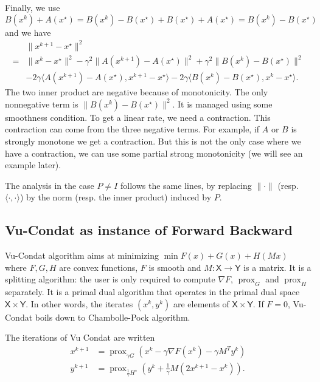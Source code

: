 \documentclass{article}
\DeclareMathOperator{\prox}{prox}
\newcommand{\sX}{{\mathsf X}}
\newcommand{\sY}{{\mathsf Y}}
\newcommand{\ps}[1]{\langle #1 \rangle}
\theoremstyle{definition}
\begin{document}
Finally, we use
$$B(x^k) + A(x^\star) = B(x^k) - B(x^\star) + B(x^\star) + A(x^\star) = B(x^k) - B(x^\star)$$
and we have 
\begin{align}
    \label{eq:FB-final}
    &\|x^{k+1} - x^\star\|^2 \\
    =& \|x^k - x^\star\|^2 -\gamma^2\|A(x^{k+1}) - A(x^\star)\|^2 + \gamma^2 \|B(x^k) - B(x^\star) \|^2\\
    &- 2\gamma\ps{A(x^{k+1})-A(x^\star),x^{k+1}-x^\star} - 2\gamma\ps{B(x^k)-B(x^\star),x^k-x^\star}.
\end{align}
The two inner product are negative because of monotonicity. The only nonnegative term is $\|B(x^k) - B(x^\star) \|^2$. It is managed using some smoothness condition. To get a linear rate, we need a contraction. This contraction can come from the three negative terms. For example, if $A$ or $B$ is strongly monotone we get a contraction. But this is not the only case where we have a contraction, we can use some partial strong monotonicity (we will see an example later).

The analysis in the case $P \neq I$ follows the same lines, by replacing $\|\cdot\|$ (resp. $\ps{\cdot,\cdot}$) by the norm (resp. the inner product) induced by $P$. 




\subsection{Vu-Condat as instance of Forward Backward}

Vu-Condat algorithm aims at minimizing $\min F(x) + G(x) + H(Mx)$ where $F,G,H$ are convex functions, $F$ is smooth and $M : \sX \to \sY$ is a matrix. It is a splitting algorithm: the user is only required to compute $\nabla F$, $\prox_G$ and $\prox_H$ separately. It is a primal dual algorithm that operates in the primal dual space $\sX \times \sY$. In other words, the iterates $(x^k,y^k)$ are elements of $\sX \times \sY$. If $F=0$, Vu-Condat boils down to Chambolle-Pock algorithm.

The iterations of Vu Condat are written
\begin{align}
    x^{k+1}   &= \prox_{\gamma G}(x^k - \gamma \nabla F(x^k) - \gamma M^T y^k)\\
    y^{k+1} &= \prox_{\frac{1}{\gamma} H^\star}(y^k + \frac{1}{\gamma}M(2x^{k+1}-x^k)).
\end{align}
\end{document}
